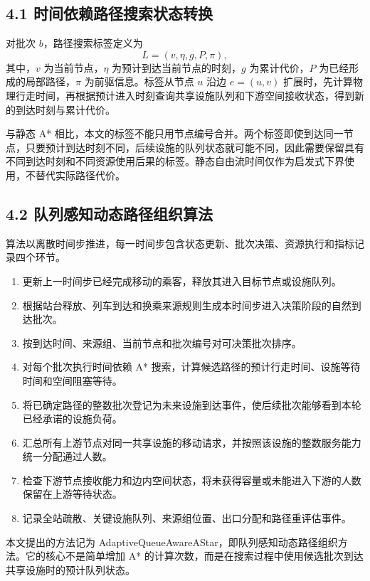 \documentclass[UTF8,a4paper,12pt]{ctexart}
\begin{document}
\subsection{4.1 时间依赖路径搜索状态转换}

对批次 \(b\)，路径搜索标签定义为
\[
L=(v,\eta,g,P,\pi),
\]
其中，\(v\) 为当前节点，\(\eta\) 为预计到达当前节点的时刻，\(g\) 为累计代价，\(P\) 为已经形成的局部路径，\(\pi\) 为前驱信息。标签从节点 \(u\) 沿边 \(e=(u,v)\) 扩展时，先计算物理行走时间，再根据预计进入时刻查询共享设施队列和下游空间接收状态，得到新的到达时刻与累计代价。

与静态 A* 相比，本文的标签不能只用节点编号合并。两个标签即使到达同一节点，只要预计到达时刻不同，后续设施的队列状态就可能不同，因此需要保留具有不同到达时刻和不同资源使用后果的标签。静态自由流时间仅作为启发式下界使用，不替代实际路径代价。

\subsection{4.2 队列感知动态路径组织算法}

算法以离散时间步推进，每一时间步包含状态更新、批次决策、资源执行和指标记录四个环节。

\begin{enumerate}
    \item 更新上一时间步已经完成移动的乘客，释放其进入目标节点或设施队列。
    \item 根据站台释放、列车到达和换乘来源规则生成本时间步进入决策阶段的自然到达批次。
    \item 按到达时间、来源组、当前节点和批次编号对可决策批次排序。
    \item 对每个批次执行时间依赖 A* 搜索，计算候选路径的预计行走时间、设施等待时间和空间阻塞等待。
    \item 将已确定路径的整数批次登记为未来设施到达事件，使后续批次能够看到本轮已经承诺的设施负荷。
    \item 汇总所有上游节点对同一共享设施的移动请求，并按照该设施的整数服务能力统一分配通过人数。
    \item 检查下游节点接收能力和边内空间状态，将未获得容量或未能进入下游的人数保留在上游等待状态。
    \item 记录全站疏散、关键设施队列、来源组位置、出口分配和路径重评估事件。
\end{enumerate}

本文提出的方法记为 AdaptiveQueueAwareAStar，即队列感知动态路径组织方法。它的核心不是简单增加 A* 的计算次数，而是在搜索过程中使用候选批次到达共享设施时的预计队列状态。
\end{document}
